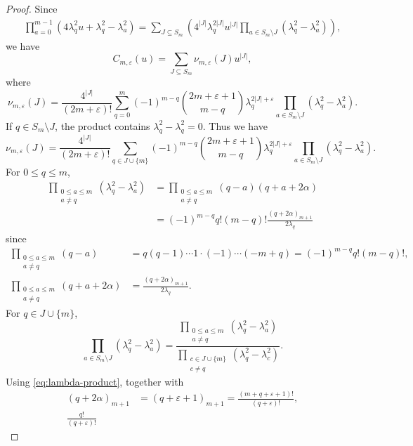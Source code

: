 \documentclass[12pt]{amsart}
\theoremstyle{definition}
\begin{document}
\begin{proof}
Since 
\[
\begin{aligned}
\prod_{a=0}^{m-1}
\left(
4\lambda_q^2u+\lambda_q^2-\lambda_a^2
\right)
=
\sum_{J \subseteq S_m} 
\left(
4^{|J|} \lambda_q^{2|J|} u^{|J|}
\prod_{a\in S_m\setminus J}
(\lambda_q^2-\lambda_a^2)
\right),
\end{aligned}
\]
we have
\[
C_{m,\varepsilon}(u)
=
\sum_{J \subseteq S_m} \nu_{m,\varepsilon}(J) 
u^{|J|},
\]
where
\[
\nu_{m,\varepsilon}(J)
=
\frac{4^{|J|}}{(2m+\varepsilon)!}
\sum_{q=0}^{m}
(-1)^{m-q}
\binom{2m+\varepsilon+1}{m-q}
\lambda_q^{2|J|+\varepsilon}
\prod_{a\in S_m\setminus J}
(\lambda_q^2-\lambda_a^2).
\]
If $q\in S_m\setminus J$, the product contains
$\lambda_q^2-\lambda_q^2=0$.  
Thus we have
\[
\nu_{m,\varepsilon}(J)
=
\frac{4^{|J|}}{(2m+\varepsilon)!}
\sum_{q \in J\cup\{m\}}
(-1)^{m-q}
\binom{2m+\varepsilon+1}{m-q}
\lambda_q^{2|J|+\varepsilon}
\prod_{a\in S_m\setminus J}
(\lambda_q^2-\lambda_a^2).
\]
For $0\le q\le m$,
\begin{equation}\label{eq:lambda-product}
\begin{aligned}   
\prod_{\substack{0\le a\le m\\a\ne q}}
(\lambda_q^2-\lambda_a^2)
&=
\prod_{\substack{0\le a\le m\\a\ne q}}
(q-a)(q+a+2\alpha)\\
&=
(-1)^{m-q}q!(m-q)!
\frac{(q+2\alpha)_{m+1}}{2\lambda_q}
\end{aligned}
\end{equation}
since
\[
\begin{aligned}
\prod_{\substack{0\le a\le m\\a\ne q}}(q-a)
&=
q (q-1) \cdots 1 \cdot (-1) \cdots (-m+q) 
=
(-1)^{m-q}q!(m-q)!,\\
\prod_{\substack{0\le a\le m\\a\ne q}}(q+a+2\alpha)
&=
\frac{(q+2\alpha)_{m+1}}{2\lambda_q}.
\end{aligned}
\]
For $q\in J \cup \{m\}$,
\[
\prod_{a\in S_m\setminus J}
(\lambda_q^2-\lambda_a^2)
=
\frac{
\displaystyle
\prod_{\substack{0\le a\le m\\a\ne q}}
(\lambda_q^2-\lambda_a^2)
}{
\displaystyle
\prod_{\substack{c\in  J \cup \{m\}\\c\ne q}}
(\lambda_q^2-\lambda_c^2)
}.
\]
Using \eqref{eq:lambda-product}, together with
\[
\begin{aligned}
(q+2\alpha)_{m+1}
&=
(q+\varepsilon +1)_{m+1}=
\frac{(m+q+\varepsilon+1)!}{(q+\varepsilon)!},\\
\frac{q!}{(q+\varepsilon)!}

\end{aligned}\]
\end{proof}
\end{document}
